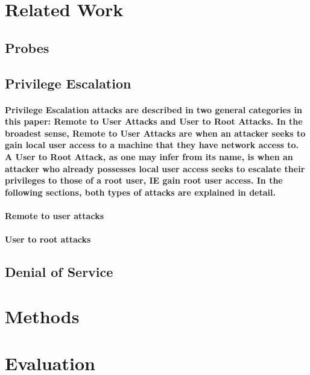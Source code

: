 \documentclass{acm_proc_article-sp}
\begin{document}
\section{Related Work}
    \subsection{Probes}
    \subsection{Privilege Escalation}
    \paragraph{Privilege Escalation attacks are described in two general categories in this paper: Remote to User Attacks and User to Root Attacks. In the broadest sense, Remote to User Attacks are when an attacker seeks to gain local user access to a machine that they have network access to. A User to Root Attack, as one may infer from its name, is when an attacker who already possesses local user access seeks to escalate their privileges to those of a root user, IE gain root user access. In the following sections, both types of attacks are explained in detail.}
    \paragraph{Remote to user attacks}
    \paragraph{User to root attacks}
    \subsection{Denial of Service}

\section{Methods}

\section{Evaluation}
\end{document}
